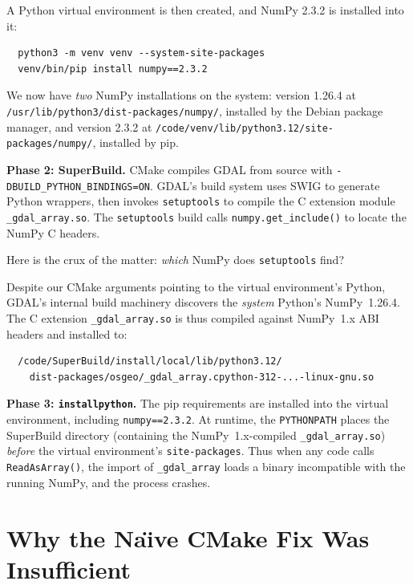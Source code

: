 \documentclass{article}
\begin{document}
\noindent A Python virtual environment is then created, and NumPy 2.3.2
is installed into it:

\begin{verbatim}
  python3 -m venv venv --system-site-packages
  venv/bin/pip install numpy==2.3.2
\end{verbatim}

\noindent We now have \emph{two} NumPy installations on the system: version
1.26.4 at \texttt{/usr/lib/python3/dist-packages/numpy/}, installed by
the Debian package manager, and version 2.3.2 at
\texttt{/code/venv/lib/python3.12/site-packages/numpy/}, installed by
pip.

\medskip
\noindent\textbf{Phase 2: SuperBuild.}  CMake compiles GDAL from source
with \texttt{-DBUILD\_PYTHON\_BINDINGS=ON}.  GDAL's build system uses
SWIG to generate Python wrappers, then invokes \texttt{setuptools} to
compile the C extension module \texttt{\_gdal\_array.so}.  The
\texttt{setuptools} build calls \texttt{numpy.get\_include()} to
locate the NumPy C headers.

Here is the crux of the matter: \emph{which} NumPy does
\texttt{setuptools} find?

Despite our CMake arguments pointing to the virtual environment's
Python, GDAL's internal build machinery discovers the \emph{system}
Python's NumPy~1.26.4.  The C extension \texttt{\_gdal\_array.so} is
thus compiled against NumPy~1.x ABI headers and installed to:

\begin{verbatim}
  /code/SuperBuild/install/local/lib/python3.12/
    dist-packages/osgeo/_gdal_array.cpython-312-...-linux-gnu.so
\end{verbatim}

\medskip
\noindent\textbf{Phase 3: \texttt{installpython}.}  The pip
requirements are installed into the virtual environment, including
\texttt{numpy==2.3.2}.  At runtime, the \texttt{PYTHONPATH} places the
SuperBuild directory (containing the NumPy~1.x-compiled
\texttt{\_gdal\_array.so}) \emph{before} the virtual environment's
\texttt{site-packages}.  Thus when any code calls
\texttt{ReadAsArray()}, the import of \texttt{\_gdal\_array} loads a
binary incompatible with the running NumPy, and the process crashes.

\section{Why the Na\"{\i}ve CMake Fix Was Insufficient}
\end{document}
